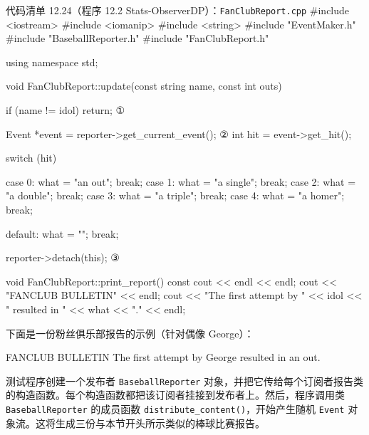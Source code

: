 \begin{codeboxt}{代码清单 12.24（程序 12.2 Stats-ObserverDP）：\texttt{Fan\allowbreak{}Club\allowbreak{}Report.\allowbreak{}cpp}}
#include <iostream>
#include <iomanip>
#include <string>
#include "EventMaker.h"
#include "BaseballReporter.h"
#include "FanClubReport.h"

using namespace std;

void FanClubReport::update(const string name, const int outs)
{
    if (name != idol) return;                       ①

    Event  *event = reporter->get_current_event();  ②
    int     hit   = event->get_hit();

    switch (hit)
    {
        case 0: what = "an out";   break;
        case 1: what = "a single"; break;
        case 2: what = "a double"; break;
        case 3: what = "a triple"; break;
        case 4: what = "a homer";  break;

        default: what = ""; break;
    }

    reporter->detach(this);                         ③
}

void FanClubReport::print_report() const
{
    cout << endl << endl;
    cout << "FANCLUB BULLETIN" << endl;
    cout << "The first attempt by " << idol
         << " resulted in " << what << "." << endl;
}
\end{codeboxt}
\par
{}\par
{}\par

下面是一份粉丝俱乐部报告的示例（针对偶像 George）：

\begin{codebox}
FANCLUB BULLETIN
The first attempt by George resulted in an out.
\end{codebox}

测试程序创建一个发布者 \texttt{Baseball\allowbreak{}Reporter} 对象，并把它传给每个订阅者报告类的构造函数。每个构造函数都把该订阅者挂接到发布者上。然后，程序调用类 \texttt{Baseball\allowbreak{}Reporter} 的成员函数 \texttt{distribute\_\allowbreak{}content(\allowbreak{})\allowbreak{}}，开始产生随机 \texttt{Event} 对象流。这将生成三份与本节开头所示类似的棒球比赛报告。

